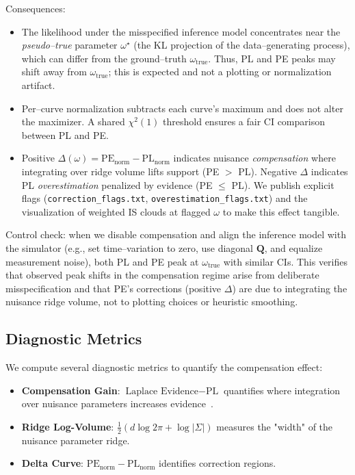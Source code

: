 \documentclass[conference]{IEEEtran}
\begin{document}
Consequences:
\begin{itemize}
  \item The likelihood under the misspecified inference model concentrates near the \emph{pseudo--true} parameter $\omega^\star$ (the KL projection of the data--generating process), which can differ from the ground--truth $\omega_{\text{true}}$. Thus, PL and PE peaks may shift away from $\omega_{\text{true}}$; this is expected and not a plotting or normalization artifact.
  \item Per--curve normalization subtracts each curve's maximum and does not alter the maximizer. A shared $\chi^2(1)$ threshold ensures a fair CI comparison between PL and PE.
  \item Positive $\Delta(\omega)=\mathrm{PE}_{\text{norm}}-\mathrm{PL}_{\text{norm}}$ indicates nuisance \emph{compensation} where integrating over ridge volume lifts support (PE $>$ PL). Negative $\Delta$ indicates PL \emph{overestimation} penalized by evidence (PE $\le$ PL). We publish explicit flags (\texttt{correction\_flags.txt}, \texttt{overestimation\_flags.txt}) and the visualization of weighted IS clouds at flagged $\omega$ to make this effect tangible.
\end{itemize}

Control check: when we disable compensation and align the inference model with the simulator (e.g., set time--variation to zero, use diagonal $\mathbf{Q}$, and equalize measurement noise), both PL and PE peak at $\omega_{\text{true}}$ with similar CIs. This verifies that observed peak shifts in the compensation regime arise from deliberate misspecification and that PE's corrections (positive $\Delta$) are due to integrating the nuisance ridge volume, not to plotting choices or heuristic smoothing.

\subsection{Diagnostic Metrics}

We compute several diagnostic metrics to quantify the compensation effect:

\begin{itemize}
\item \textbf{Compensation Gain}: $\text{Laplace Evidence} - \text{PL}$ quantifies where integration over nuisance parameters increases evidence~\cite{kass1995}.
\item \textbf{Ridge Log-Volume}: $\frac{1}{2}(d \log 2\pi + \log|\Sigma|)$ measures the "width" of the nuisance parameter ridge.
\item \textbf{Delta Curve}: $\text{PE}_{\text{norm}} - \text{PL}_{\text{norm}}$ identifies correction regions.
\end{itemize}
\end{document}
